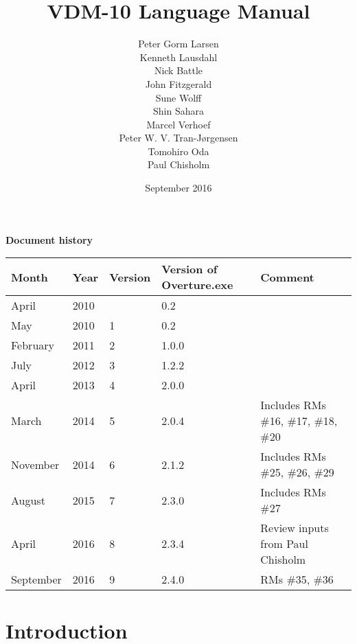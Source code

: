 \documentclass{overturerepchap}
\begin{document}
\title{VDM-10 Language Manual}
\author{Peter Gorm Larsen\\
        Kenneth Lausdahl\\
        Nick Battle\\
        John Fitzgerald\\
        Sune Wolff\\
        Shin Sahara\\
        Marcel Verhoef\\
        Peter W. V. Tran-J\o{}rgensen\\
        Tomohiro Oda\\
        Paul Chisholm}

\date{September 2016}

\maketitle


{\textbf{Document history}}

\begin{tabular}{|l|l|l|l|l|}\hline
Month   & Year & Version & Version of Overture.exe & Comment \\ \hline
April   & 2010 &         & 0.2   & \\ \hline
May     & 2010 & 1       & 0.2   &  \\ \hline
February& 2011 & 2       & 1.0.0 &  \\ \hline
July    & 2012 & 3       & 1.2.2 & \\ \hline
April   & 2013 & 4       & 2.0.0 & \\ \hline
March & 2014 & 5 & 2.0.4 &
Includes RMs \#16, \#17, \#18, \#20 \\ \hline
November & 2014 & 6 & 2.1.2 &
Includes RMs \#25, \#26, \#29 \\ \hline
August & 2015 & 7 & 2.3.0 &
Includes RMs \#27 \\ \hline
April & 2016 & 8 & 2.3.4 & Review inputs from Paul Chisholm \\ \hline
September & 2016 & 9 & 2.4.0 & RMs \#35, \#36 \\ \hline
\end{tabular}

\tableofcontents
\newpage
\mbox{}
\newpage
{}
\setcounter{page}{1}

\chapter{Introduction}
\end{document}
